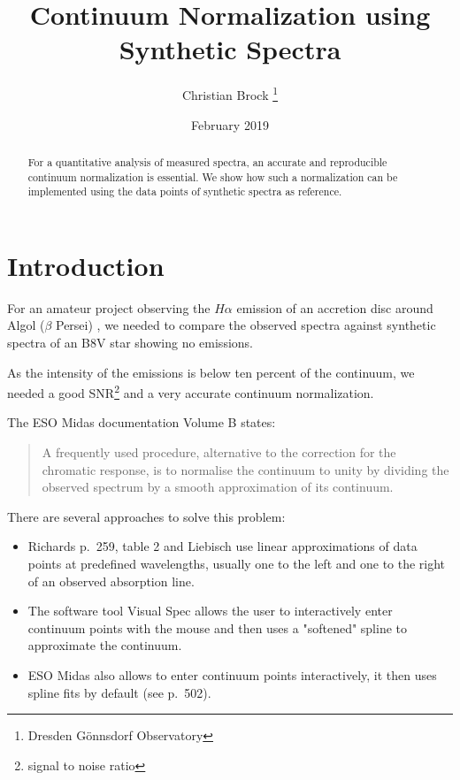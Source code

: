 \documentclass[10pt,a4paper,notitlepage,twocolumn]{article}
\title{Continuum Normalization using Synthetic Spectra}
\author{Christian Brock \footnote{Dresden Gönnsdorf Observatory}}
\date{February 2019}
\begin{document}
\setlength{\parindent}{0pt} 
\setlength{\parskip}{4pt} 

\maketitle

\begin{abstract}
	For a quantitative analysis of measured spectra, an accurate and reproducible continuum normalization is essential.
	We show how such a normalization can be implemented using the data points of synthetic spectra as reference.
\end{abstract}

\section{Introduction}

For an amateur project observing the $H\alpha$ emission of an accretion disc around Algol ($\beta$ Persei) \cite{Bitnar2017}, we needed to compare the observed spectra against synthetic spectra of an B8V star showing no emissions.

As the intensity of the emissions is below ten percent of the continuum, we needed a good SNR\footnote{signal to noise ratio} and a very accurate continuum normalization.

The ESO Midas documentation \cite{EsoMidas} Volume B states:
\begin{quote}
	A frequently used procedure, alternative to the correction for the chromatic response, is to normalise the continuum to unity by dividing the observed spectrum by a smooth approximation of its continuum.
\end{quote}

There are several approaches to solve this problem:
\begin{itemize} %
\item Richards \cite{Richards1993} p.\ 259, table 2 and Liebisch \cite{Liebisch2018} use linear approximations of data points at predefined wavelengths, usually one to the left and one to the right of an observed absorption line.
\item The software tool Visual Spec \cite{DesnouxVSpecTutorial} allows the user to interactively enter continuum points with the mouse and then uses a "softened" spline to approximate the continuum.
\item ESO Midas \cite{EsoMidas} also allows to enter continuum points interactively, it then uses spline fits by default (see \cite{SablowskiSchanne2018} p.\ 502).
\end{itemize}
\end{document}
